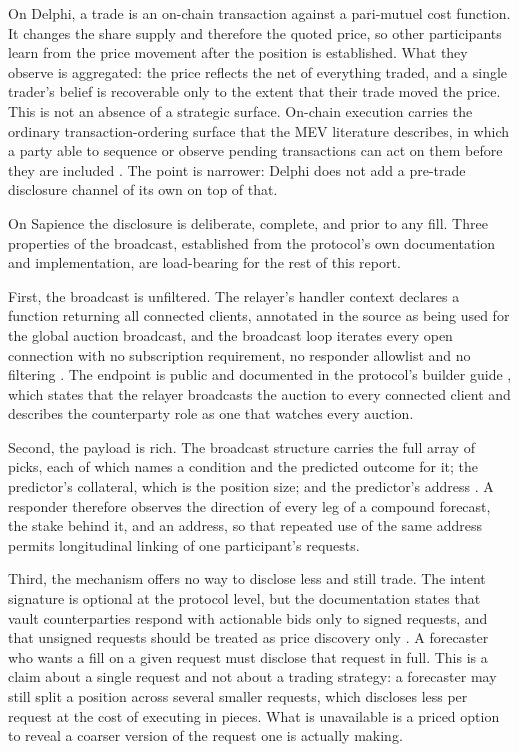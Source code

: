 On Delphi, a trade is an on-chain transaction against a pari-mutuel cost function. It
changes the share supply and therefore the quoted price, so other participants learn from
the price movement after the position is established. What they observe is aggregated: the
price reflects the net of everything traded, and a single trader's belief is recoverable
only to the extent that their trade moved the price. This is not an absence of a strategic
surface. On-chain execution carries the ordinary transaction-ordering surface that the MEV
literature describes, in which a party able to sequence or observe pending transactions can
act on them before they are included \cite{daian2019flashboys,ethereummev}. The point is
narrower: Delphi does not add a pre-trade disclosure channel of its own on top of that.

On Sapience the disclosure is deliberate, complete, and prior to any fill. Three properties
of the broadcast, established from the protocol's own documentation and implementation, are
load-bearing for the rest of this report.

First, the broadcast is unfiltered. The relayer's handler context declares a function
returning all connected clients, annotated in the source as being used for the global
auction broadcast, and the broadcast loop iterates every open connection with no
subscription requirement, no responder allowlist and no filtering
\cite{sapience2026relayer}. The endpoint is public and documented in the protocol's builder guide
\cite{sapience2026builderguide}, which states that the relayer broadcasts the auction to
every connected client and describes the counterparty role as one that watches every
auction.

Second, the payload is rich. The broadcast structure carries the full array of picks, each
of which names a condition and the predicted outcome for it; the predictor's collateral,
which is the position size; and the predictor's address \cite{sapience2026relayer}. A
responder therefore observes the direction of every leg of a compound forecast, the stake
behind it, and an address, so that repeated use of the same address permits longitudinal
linking of one participant's requests.

Third, the mechanism offers no way to disclose less and still trade. The intent signature is
optional at the protocol level, but the documentation states that vault counterparties
respond with actionable bids only to signed requests, and that unsigned requests should be
treated as price discovery only \cite{sapience2026builderguide}. A forecaster who wants a
fill on a given request must disclose that request in full. This is a claim about a single
request and not about a trading strategy: a forecaster may still split a position across
several smaller requests, which discloses less per request at the cost of executing in
pieces. What is unavailable is a priced option to reveal a coarser version of the request
one is actually making.

